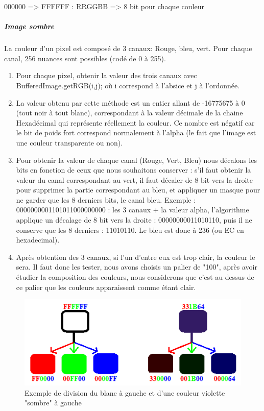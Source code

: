 	000000 => FFFFFF : RRGGBB => 8 bit pour chaque couleur
			\subparagraph{Image sombre}
				La couleur d'un pixel est composé de 3 canaux: Rouge, bleu, vert. Pour chaque canal, 256 nuances sont possibles (codé de 0 à 255).
				\begin{enumerate}
					\item Pour chaque pixel, obtenir la valeur des trois canaux avec BufferedImage.getRGB(i,j); où i correspond à l'absice et j à l'ordonnée. 
					\item La valeur obtenu par cette méthode est un entier allant de -16775675 à 0 (tout noir à tout blanc), correspondant à la valeur décimale de la chaine Hexadécimal qui représente réellement la couleur. Ce nombre est négatif car le bit de poids fort correspond normalement à l'alpha (le fait que l'image est une couleur transparente ou non).
					\item Pour obtenir la valeur de chaque canal (Rouge, Vert, Bleu) nous décalons les bits en fonction de ceux que nous souhaitons conserver : s'il faut obtenir la valeur du canal correspondant au vert, il faut décaler de 8 bit vers la droite pour supprimer la partie correspondant au bleu, et appliquer un masque pour ne garder que les 8 derniers bits, le canal bleu. Exemple : 0000000001101011000000000 : les 3 canaux + la valeur alpha, l'algorithme applique un décalage de 8 bit vers la droite : 00000000011010110, puis il ne conserve que les 8 derniers : 11010110. Le bleu est donc à 236 (ou EC en hexadecimal).
					\item Après obtention des 3 canaux, si l'un d'entre eux est trop clair, la couleur le sera. Il faut donc les tester, nous avons choisis un palier de "100", après avoir étudier la composition des couleurs, nous considerons que c'est au dessus de ce palier que les couleurs apparaissent comme étant clair.
				\end{enumerate}
				\begin{figure}[!h]
					\centering
					\includegraphics{img/reasoningRGB.png}
					\caption{Exemple de division du blanc à gauche et d'une couleur violette "sombre" à gauche}
					\label{divisionRGB}
				\end{figure}
				
